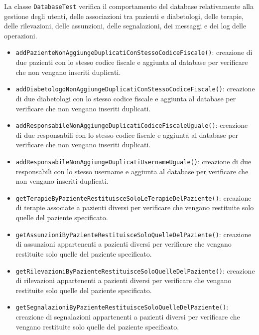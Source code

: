La classe \texttt{DatabaseTest} verifica il comportamento del database relativamente alla gestione degli utenti, delle associazioni tra pazienti e diabetologi, delle terapie, delle rilevazioni, delle assunzioni, delle segnalazioni, dei messaggi e dei log delle operazioni.

\begin{itemize}
	
	\item \texttt{addPazienteNonAggiungeDuplicatiConStessoCodiceFiscale()}: creazione di due pazienti con lo stesso codice fiscale e aggiunta al database per verificare che non vengano inseriti duplicati.
	
	\item \texttt{addDiabetologoNonAggiungeDuplicatiConStessoCodiceFiscale()}: creazione di due diabetologi con lo stesso codice fiscale e aggiunta al database per verificare che non vengano inseriti duplicati.
	
	\item \texttt{addResponsabileNonAggiungeDuplicatiCodiceFiscaleUguale()}: creazione di due responsabili con lo stesso codice fiscale e aggiunta al database per verificare che non vengano inseriti duplicati.
	
	\item \texttt{addResponsabileNonAggiungeDuplicatiUsernameUguale()}: creazione di due responsabili con lo stesso username e aggiunta al database per verificare che non vengano inseriti duplicati.
	
	\item \texttt{getTerapieByPazienteRestituisceSoloLeTerapieDelPaziente()}: creazione di terapie associate a pazienti diversi per verificare che vengano restituite solo quelle del paziente specificato.
	
	\item \texttt{getAssunzioniByPazienteRestituisceSoloQuelleDelPaziente()}: creazione di assunzioni appartenenti a pazienti diversi per verificare che vengano restituite solo quelle del paziente specificato.
	
	\item \texttt{getRilevazioniByPazienteRestituisceSoloQuelleDelPaziente()}: creazione di rilevazioni appartenenti a pazienti diversi per verificare che vengano restituite solo quelle del paziente specificato.
	
	\item \texttt{getSegnalazioniByPazienteRestituisceSoloQuelleDelPaziente()}: creazione di segnalazioni appartenenti a pazienti diversi per verificare che vengano restituite solo quelle del paziente specificato.
	

\end{itemize}

